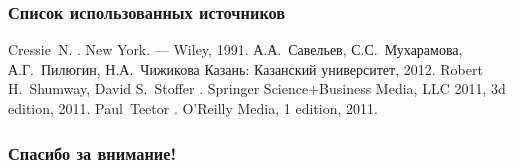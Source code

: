 \documentclass{beamer}
\begin{document}
\begin{frame}
  \frametitle{Список использованных источников}
  \begin{scriptsize}
  \begin{thebibliography}{5}
    \beamertemplatebookbibitems
      Cressie~N.
      .
      \newblock New York. --- Wiley, 1991.
    \beamertemplatebookbibitems
      А.А.~Савельев, С.С.~Мухарамова, А.Г.~Пилюгин, Н.А.~Чижикова
      \newblock Казань: Казанский университет, 2012.
    \beamertemplatebookbibitems
      Robert H.~Shumway, David S.~Stoffer
      .
      \newblock Springer Science+Business Media, LLC 2011, 3d edition, 2011.
    \beamertemplatebookbibitems
      Paul~Teetor
      .
      \newblock O’Reilly Media, 1 edition, 2011.
  \end{thebibliography}
\end{scriptsize}
\end{frame}

%
%

\begin{frame}[c]
\begin{center}
\frametitle{\LARGE Спасибо за внимание!}

{\LARGE \inserttitle}

\bigskip

{\insertauthor} 

\bigskip\bigskip

{\insertinstitute}

\bigskip\bigskip

{\large \insertdate}
\end{center}
\end{frame}
\end{document}

